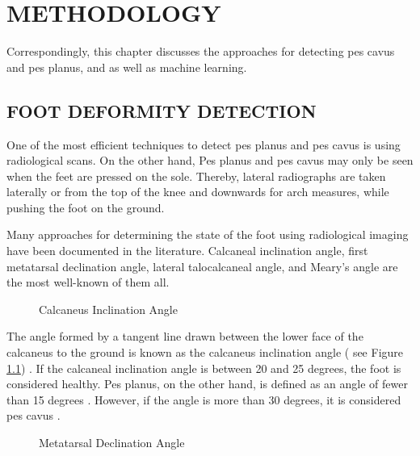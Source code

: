 \chapter{METHODOLOGY}\label{chp:Methodology}

Correspondingly, this chapter discusses the approaches for detecting pes cavus and pes planus, and as well as machine learning.

\section{FOOT DEFORMITY DETECTION} \label{sec:MethodologyFootDeformityDetection}

One of the most efficient techniques to detect pes planus and pes cavus is using radiological scans. On the other hand, Pes planus and pes cavus may only be seen when the feet are pressed on the sole. Thereby, lateral radiographs are taken laterally or from the top of the knee and downwards for arch measures, while pushing the foot on the ground.

Many approaches for determining the state of the foot using radiological imaging have been documented in the literature. Calcaneal inclination angle, first metatarsal declination angle, lateral talocalcaneal angle, and Meary's angle are the most well-known of them all.

\begin{figure}[htbp]
\centering
{}
\caption{Calcaneus Inclination Angle \cite{deniz2014ccocuklardaki}}
\label{fig:MethodologyCalcaneusInclinationAngle}
\end{figure}

The angle formed by a tangent line drawn between the lower face of the calcaneus to the ground is known as the calcaneus inclination angle ( see Figure \ref{fig:MethodologyCalcaneusInclinationAngle}) \cite{deniz2014ccocuklardaki}. If the calcaneal inclination angle is between 20 and 25 degrees, the foot is considered healthy. Pes planus, on the other hand, is defined as an angle of fewer than 15 degrees \cite{flores2019adult}. However, if the angle is more than 30 degrees, it is considered pes cavus \cite{yates2009merriman}.

\begin{figure}[htbp]
\centering
{}
\caption{Metatarsal Declination Angle \cite{davies2012imaging}}
\label{fig:MethodologyMetatarsalDeclinationAngle}
\end{figure}

